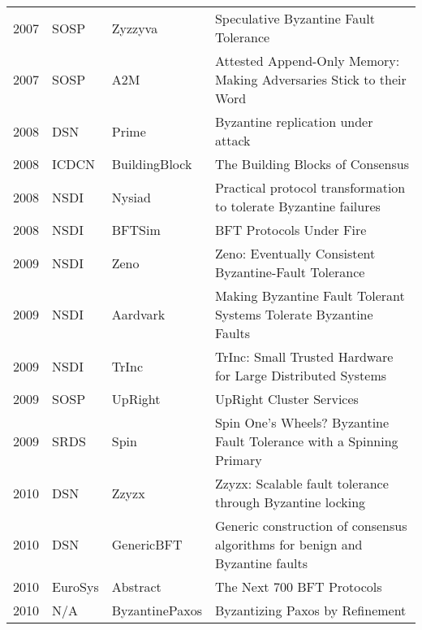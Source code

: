 \documentclass{article}
\begin{document}
\begin{landscape}
\begin{table}[]
{\begin{tabular}{llll}
2007 & SOSP              & Zyzzyva        & Speculative Byzantine Fault Tolerance                                                     \\
2007 & SOSP              & A2M            & Attested Append-Only Memory: Making Adversaries Stick to their Word                       \\
2008 & DSN               & Prime          & Byzantine replication under attack                                                        \\
2008 & ICDCN             & BuildingBlock  & The Building Blocks of Consensus                                                          \\
2008 & NSDI              & Nysiad         & Practical protocol transformation to tolerate Byzantine failures                          \\
2008 & NSDI              & BFTSim         & BFT Protocols Under Fire                                                                  \\
2009 & NSDI              & Zeno           & Zeno: Eventually Consistent Byzantine-Fault Tolerance                                     \\
2009 & NSDI              & Aardvark       & Making Byzantine Fault Tolerant Systems Tolerate Byzantine Faults                         \\
2009 & NSDI              & TrInc          & TrInc: Small Trusted Hardware for Large Distributed Systems                               \\
2009 & SOSP              & UpRight        & UpRight Cluster Services                                                                  \\
2009 & SRDS              & Spin           & Spin One’s Wheels? Byzantine Fault Tolerance with a Spinning Primary                      \\
2010 & DSN               & Zzyzx          & Zzyzx: Scalable fault tolerance through Byzantine locking                                 \\
2010 & DSN               & GenericBFT     & Generic construction of consensus algorithms for benign and Byzantine faults              \\
2010 & EuroSys           & Abstract       & The Next 700 BFT Protocols                                                                \\
2010 & N/A               & ByzantinePaxos & Byzantizing Paxos by Refinement                                                           \\

\end{tabular}}
\end{table}
\end{landscape}
\end{document}
